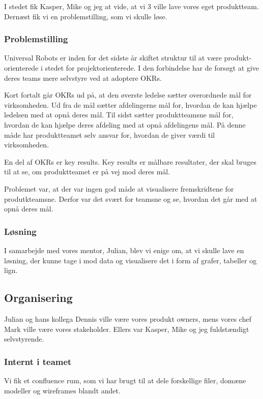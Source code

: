\documentclass[a4paper]{article}
\begin{document}
I stedet fik Kasper, Mike og jeg at vide,
at vi 3 ville lave vores eget produktteam.
Dernæst fik vi en problemstilling, som vi skulle løse.

\subsubsection{Problemstilling}
Universal Robots er inden for det sidste år skiftet struktur til at være 
produkt-orienterede i stedet for projektorienterede.
I den forbindelse har de forsøgt at give deres teams mere selvstyre ved at 
adoptere OKRs.

Kort fortalt går OKRs ud på, 
at den øverste ledelse sætter overordnede mål for virksomheden.
Ud fra de mål sætter afdelingerne mål for,
hvordan de kan hjælpe ledelsen med at opnå deres mål.
Til sidst sætter produktteamsne mål for, 
hvordan de kan hjælpe deres afdeling med at opnå afdelingens mål.
På denne måde har produktteamet selv ansvar for,
hvordan de giver værdi til virksomheden.

En del af OKRs er key results. 
Key results er målbare resultater, der skal bruges til at se,
om produktteamet er på vej mod deres mål.

Problemet var, at der var ingen god måde at visualisere 
fremskridtene for produtkteamsne.
Derfor var det svært for teamsne og se, hvordan det går med at opnå deres mål.

\subsubsection{Løsning}
I samarbejde med vores mentor, Julian, blev vi enige om, at vi skulle lave en 
løsning, der kunne tage i mod data og visualisere det i form af 
grafer, tabeller og lign.

\subsection{Organisering}
\label{organisering}
Julian og hans kollega Dennis ville være vores produkt owners,
mens vores chef Mark ville være vores stakeholder.
Ellers var Kasper, Mike og jeg fuldstændigt selvstyrende.

\subsubsection{Internt i teamet}
Vi fik et confluence rum, som vi har brugt til at dele forskellige filer, 
domæne modeller og wireframes blandt andet.
\end{document}
